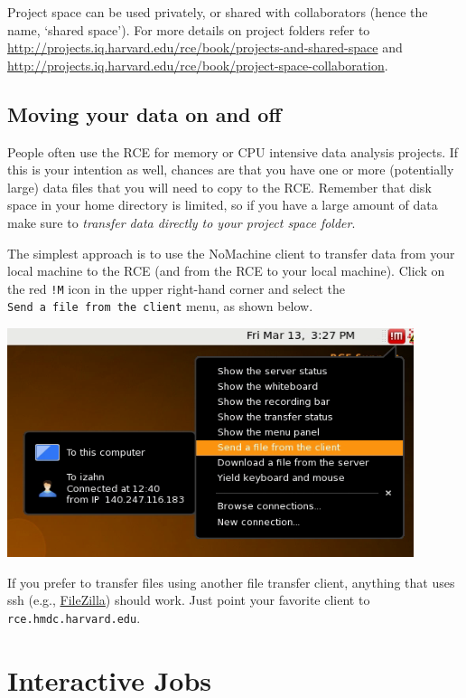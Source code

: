 \documentclass[
]{book}
\begin{document}
Project space can be used privately, or shared with collaborators (hence
the name, `shared space'). For more details on project folders refer to
\url{http://projects.iq.harvard.edu/rce/book/projects-and-shared-space} and
\url{http://projects.iq.harvard.edu/rce/book/project-space-collaboration}.

\hypertarget{moving-your-data-on-and-off}{%
\section{Moving your data on and off}\label{moving-your-data-on-and-off}}

People often use the RCE for memory or CPU intensive data analysis
projects. If this is your intention as well, chances are that you have
one or more (potentially large) data files that you will need to copy to
the RCE. Remember that disk space in your home directory is limited, so
if you have a large amount of data make sure to \emph{transfer data directly
to your project space folder}.

The simplest approach is to use the NoMachine client to transfer data
from your local machine to the RCE (and from the RCE to your local
machine). Click on the red \texttt{!M} icon in the upper right-hand corner and
select the \texttt{Send\ a\ file\ from\ the\ client} menu, as shown below.

\includegraphics{images/NoMachineMenu.png}

If you prefer to transfer files using another file transfer client,
anything that uses ssh (e.g.,
\href{http://filezilla-project.org/}{FileZilla}) should work. Just point your
favorite client to \texttt{rce.hmdc.harvard.edu}.

\hypertarget{interactive-jobs}{%
\chapter{Interactive Jobs}\label{interactive-jobs}}
\end{document}
